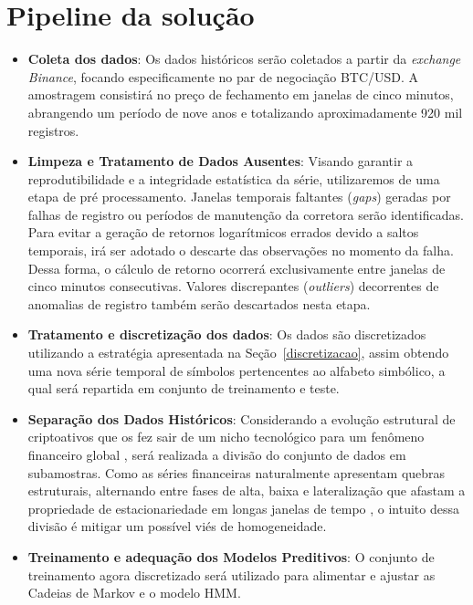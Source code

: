 \documentclass[
    12pt,                %
    openright,           %
    oneside,             %
    a4paper,             %
    english,             %
    brazil               %
]{abntex2}
\begin{document}
\section{Pipeline da solução}

\begin{itemize}

    \item \textbf{Coleta dos dados}: Os dados históricos serão coletados a partir da \textit{exchange Binance}, focando especificamente no par 
    de negociação BTC/USD. A amostragem consistirá no preço de fechamento em janelas de cinco minutos, abrangendo um período de nove anos e 
    totalizando aproximadamente 920 mil registros.

    \item \textbf{Limpeza e Tratamento de Dados Ausentes}: Visando garantir a reprodutibilidade e a integridade estatística da série,
    utilizaremos de uma etapa de pré processamento. Janelas temporais faltantes (\textit{gaps}) geradas por falhas de registro ou 
    períodos de manutenção da corretora serão identificadas. Para evitar a geração de retornos logarítmicos errados devido a saltos temporais, 
    irá ser adotado o descarte das observações no momento da falha. Dessa forma, o cálculo de retorno ocorrerá exclusivamente entre janelas de cinco 
    minutos consecutivas. Valores discrepantes (\textit{outliers}) decorrentes de anomalias de registro também serão descartados nesta etapa.

    \item \textbf{Tratamento e discretização dos dados}: Os dados são discretizados utilizando
    a estratégia apresentada na Seção~\ref{discretizacao}, assim obtendo uma nova série temporal de
    símbolos pertencentes ao alfabeto simbólico, a qual será repartida em conjunto
    de treinamento e teste.

    \item \textbf{Separação dos Dados Históricos}:
    Considerando a evolução estrutural de criptoativos 
    que os fez sair de um nicho tecnológico para um fenômeno financeiro global \cite{MAKAROV2022}, 
    será realizada a divisão do conjunto de dados em subamostras. Como as séries financeiras 
    naturalmente apresentam quebras estruturais, alternando entre fases de alta, baixa e 
    lateralização que afastam a propriedade de estacionariedade em  longas janelas de tempo \cite{morettin2018analise}, o intuito 
    dessa divisão é mitigar um possível viés de homogeneidade.

    \item \textbf{Treinamento e adequação dos Modelos Preditivos}: O conjunto de treinamento agora discretizado será utilizado 
    para alimentar e ajustar as Cadeias de Markov e o modelo HMM.


\end{itemize}
\end{document}
